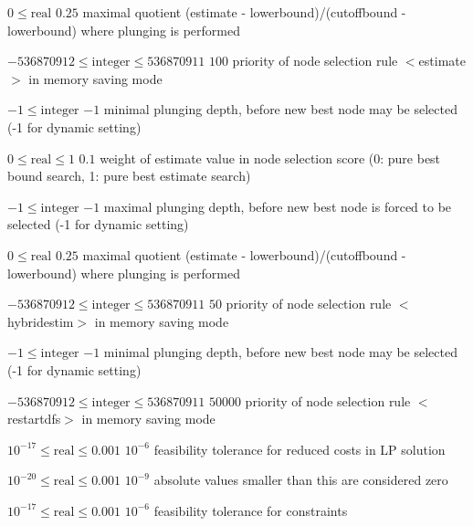 %
{$0\leq\textrm{real}$}%
{$0.25$}%
{maximal quotient (estimate - lowerbound)/(cutoffbound - lowerbound) where plunging is performed}%
{}

%
{$-536870912\leq\textrm{integer}\leq536870911$}%
{$100$}%
{priority of node selection rule $<$estimate$>$ in memory saving mode}%
{}

%
{$-1\leq\textrm{integer}$}%
{$-1$}%
{minimal plunging depth, before new best node may be selected (-1 for dynamic setting)}%
{}

%
{$0\leq\textrm{real}\leq1$}%
{$0.1$}%
{weight of estimate value in node selection score (0: pure best bound search, 1: pure best estimate search)}%
{}

%
{$-1\leq\textrm{integer}$}%
{$-1$}%
{maximal plunging depth, before new best node is forced to be selected (-1 for dynamic setting)}%
{}

%
{$0\leq\textrm{real}$}%
{$0.25$}%
{maximal quotient (estimate - lowerbound)/(cutoffbound - lowerbound) where plunging is performed}%
{}

%
{$-536870912\leq\textrm{integer}\leq536870911$}%
{$50$}%
{priority of node selection rule $<$hybridestim$>$ in memory saving mode}%
{}

%
{$-1\leq\textrm{integer}$}%
{$-1$}%
{minimal plunging depth, before new best node may be selected (-1 for dynamic setting)}%
{}

%
{$-536870912\leq\textrm{integer}\leq536870911$}%
{$50000$}%
{priority of node selection rule $<$restartdfs$>$ in memory saving mode}%
{}

%
{$10^{-17}\leq\textrm{real}\leq0.001$}%
{$10^{- 6}$}%
{feasibility tolerance for reduced costs in LP solution}%
{}

%
{$10^{-20}\leq\textrm{real}\leq0.001$}%
{$10^{- 9}$}%
{absolute values smaller than this are considered zero}%
{}

%
{$10^{-17}\leq\textrm{real}\leq0.001$}%
{$10^{- 6}$}%
{feasibility tolerance for constraints}%
{}

